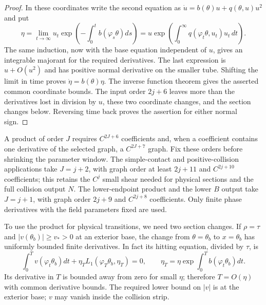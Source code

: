 \begin{proof}
In these coordinates write the second equation as
$\dot u=b(\theta)u+q(\theta,u)u^2$ and put
\begin{equation}\label{eq:uniform-amplitude-limit}
 \eta=\lim_{t\to\infty}u_t
       \exp\left(-\int_0^t b(\varphi_s\theta)ds\right)
 =u\exp\left(\int_0^\infty
                    q(\varphi_t\theta,u_t)u_t\,dt\right).
\end{equation}
The same induction, now with the base equation independent of $u$,
gives an integrable majorant for the required derivatives. The last
expression is $u+O(u^2)$ and has positive normal derivative on the
smaller tube. Shifting the limit in time proves
$\dot\eta=b(\theta)\eta$. The inverse function theorem gives the
asserted common coordinate bounds. The input order $2j+6$ leaves more
than the derivatives lost in division by $u$, these two coordinate
changes, and the section changes below. Reversing time back proves
the assertion for either normal sign.
\end{proof}

A product of order $J$ requires $C^{2J+6}$ coefficients and, when a
coefficient contains one derivative of the selected graph, a
$C^{2J+7}$ graph. Fix these orders before shrinking the parameter window.
The simple-contact and positive-collision applications take $J=j+2$,
with graph order at least $2j+11$ and $C^{2j+10}$ coefficients;
this retains the $C^j$ small shear needed for physical sections and the
full collision output $N$. The lower-endpoint product and the lower
$B$ output take $J=j+1$, with graph order $2j+9$ and
$C^{2j+8}$ coefficients. Only finite phase derivatives with the field
parameters fixed are used.

To use the product for physical transitions, we need two section changes. If
$\rho=\tau$ and $|v(\theta_b)|\ge v_*>0$ at an exterior base, the
change from $\theta=\theta_b$ to $x=\theta_b$ has uniformly bounded
finite derivatives. In fact its hitting equation, divided by $\tau$,
is
\[
 \int_0^T v(\varphi_t\theta_b)dt
       +\eta_T L_1(\varphi_T\theta_b,\eta_T)=0,
 \qquad \eta_T=\eta\exp\int_0^T b(\varphi_t\theta_b)dt.
\]
Its derivative in $T$ is bounded away from zero for small $\eta$;
therefore $T=O(\eta)$ with common derivative bounds. The required
lower bound on $|v|$ is at the exterior base; $v$ may vanish inside the
collision strip.

